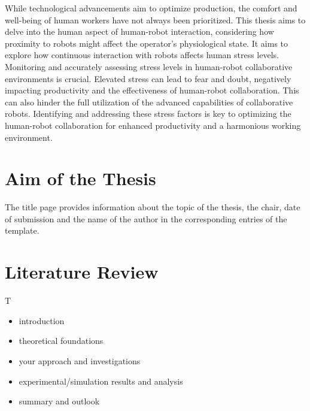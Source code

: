 While technological advancements aim to optimize production, the comfort and well-being of human workers have not always been prioritized. This thesis aims to delve into the human aspect of human-robot interaction, considering how proximity to robots might affect the operator's physiological state. It aims to explore how continuous interaction with robots affects human stress levels. Monitoring and accurately assessing stress levels in human-robot collaborative environments is crucial. Elevated stress can lead to fear and doubt, negatively impacting productivity and the effectiveness of human-robot collaboration. This can also hinder the full utilization of the advanced capabilities of collaborative robots. Identifying and addressing these stress factors is key to optimizing the human-robot collaboration for enhanced productivity and a harmonious working environment. 


\section{Aim of the Thesis}
The title page provides information about the topic of the thesis, the chair, date of submission and the name of the author in the corresponding entries of the template.

\section{Literature Review}
\label{hinweise:kurzfassung}

T
\begin{itemize}
	\item introduction
	\item theoretical foundations
	\item your approach and investigations
	\item experimental/simulation results and analysis
	\item summary and outlook
\end{itemize}
